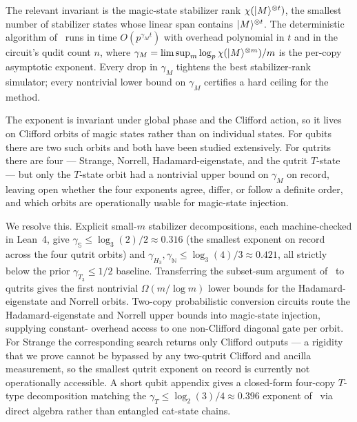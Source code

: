 \documentclass[11pt]{article}
\theoremstyle{definition}
\newcommand{\microspace}{\mspace{0.5mu}}
\newcommand{\ket}[1]{\lvert\microspace #1 \microspace \rangle}
\newcommand{\chiR}{\chi}
\begin{document}
	The relevant invariant is the magic-state stabilizer rank
	$\chiR(\ket{M}^{\otimes t})$, the smallest number of stabilizer
	states whose linear span contains $\ket{M}^{\otimes t}$. The
	deterministic algorithm of~\cite{bravyi2016trading} runs in time
	$O(p^{\gamma_M t})$ with overhead polynomial in $t$ and in the
	circuit's qudit count $n$, where
	\(\gamma_M = \limsup_m \log_p \chiR(\ket{M}^{\otimes m})/m\)
	is the per-copy asymptotic exponent. Every drop in $\gamma_M$
	tightens the best stabilizer-rank simulator; every nontrivial
	lower bound on $\gamma_M$ certifies a hard ceiling for the method.

	The exponent is invariant under global phase and the Clifford
	action, so it lives on Clifford orbits of magic states rather than
	on individual states. For qubits there are two such orbits and both
	have been studied extensively. For qutrits there are four ---
	Strange, Norrell, Hadamard-eigenstate, and the qutrit $T$-state
	--- but only the $T$-state orbit had a nontrivial upper bound on
	$\gamma_M$ on record, leaving open whether the four exponents
	agree, differ, or follow a definite order, and which orbits are
	operationally usable for magic-state injection.

	We resolve this. Explicit small-$m$ stabilizer decompositions,
	each machine-checked in Lean~4, give
	$\gamma_{\mathbb{S}} \le \log_3(2)/2 \approx 0.316$ (the smallest
	exponent on record across the four qutrit orbits) and
	$\gamma_{H_3}, \gamma_{\mathbb{N}} \le \log_3(4)/3 \approx 0.421$,
	all strictly below the prior $\gamma_{T_3} \le 1/2$ baseline.
	Transferring the subset-sum argument
	of~\cite{lovitz2022techniques} to qutrits gives the first
	nontrivial $\Omega(m / \log m)$ lower bounds for the
	Hadamard-eigenstate and Norrell orbits. Two-copy probabilistic
	conversion circuits route the Hadamard-eigenstate and Norrell
	upper bounds into magic-state injection, supplying constant-
	overhead access to one non-Clifford diagonal gate per orbit. For
	Strange the corresponding search returns only Clifford outputs ---
	a rigidity that we prove cannot be bypassed by any two-qutrit
	Clifford and ancilla measurement, so the smallest qutrit exponent
	on record is currently not operationally accessible. A short
	qubit appendix gives a closed-form four-copy $T$-type
	decomposition matching the $\gamma_T \le \log_2(3)/4 \approx 0.396$
	exponent of~\cite{qassim2021improved} via direct algebra rather
	than entangled cat-state chains.
\end{document}
